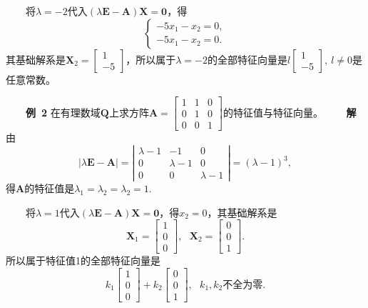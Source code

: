 \documentclass[compress,mathserif,cjk]{beamer}
\theoremstyle{remark}
\numberwithin{equation}{section}
\newcommand{\hei}{\bf}      %
\begin{document}
\begin{CJK}{UTF8}{gbsn}
\begin{frame}
 \ \ \ \ 将$\lambda=-2$代入$(\lambda\bm E-\bm A)\bm X=\bm 0$，得
 $$\left\{\begin{array}{r}
 -5x_1-x_2=0,\\-5x_1-x_2=0.
 \end{array}\right.$$
 其基础解系是$\bm X_2=\left[\begin{matrix}1\\-5\end{matrix}\right]$，所以属于$\lambda=-2$的全部特征向量是$l\left[\begin{matrix}1\\-5\end{matrix}\right],~l\neq0$是任意常数。
\end{frame}
\begin{frame}
 \ \ \ \ {\hei 例~2} 在有理数域$\bm Q$上求方阵$\bm A=\left[\begin{matrix}1&1&0\\0&1&0\\0&0&1\end{matrix}\right]$的特征值与特征向量。
 \pause\vskip 2pt
 \ \ \ \ {\hei 解} 由
 $$|\lambda\bm E-\bm A|=\left|\begin{matrix}\lambda-1&-1&0\\0&\lambda-1&0\\0&0&\lambda-1\end{matrix}\right|=(\lambda-1)^3,$$
 得$\bm A$的特征值是$\lambda_1=\lambda_2=\lambda_2=1.$
 \end{frame}
\begin{frame}
 \ \ \ \ 将$\lambda=1$代入$(\lambda\bm E-\bm A)\bm X=\bm 0$，得$x_2=0$，其基础解系是
 $$\bm X_1=\left[\begin{matrix}1\\0\\0\end{matrix}\right],~~~\bm X_2=\left[\begin{matrix}0\\0\\1\end{matrix}\right].$$
 所以属于特征值1的全部特征向量是
 $$k_1\left[\begin{matrix}1\\0\\0\end{matrix}\right]+k_2\left[\begin{matrix}0\\0\\1\end{matrix}\right],~~~k_1,k_2\mbox{不全为零}.$$
\end{frame}
\begin{frame}


\end{frame}
\end{CJK}
\end{document}
